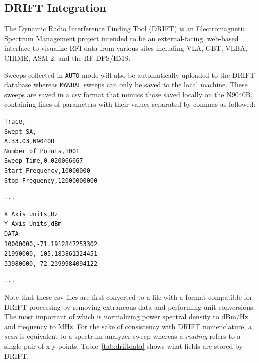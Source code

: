 \documentclass[titlepage]{article}
\begin{document}
\subsection{DRIFT Integration}
The Dynamic Radio Interference Finding Tool (DRIFT) is an Electromagnetic Spectrum Management project intended to be an external-facing, web-based interface to visualize RFI data from various sites including VLA, GBT, VLBA, CHIME, ASM-2, and the RF-DFS/EMS.\@

Sweeps collected in \verb|AUTO| mode will also be automatically uploaded to the DRIFT database whereas \verb|MANUAL| sweeps can only be saved to the local machine. These sweeps are saved in a csv format that mimics those saved locally on the N9040B, containing lines of parameters with their values separated by commas as followed:
\begin{lstlisting}[belowskip=0pt]
Trace,
Swept SA,
A.33.03,N9040B
Number of Points,1001
Sweep Time,0.020066667
Start Frequency,10000000
Stop Frequency,12000000000
\end{lstlisting}
\begin{lstlisting}[aboveskip=0pt, belowskip=0pt, numbers=none]
...
\end{lstlisting}
\begin{lstlisting}[aboveskip=0pt, belowskip=0pt, firstnumber=43]
X Axis Units,Hz
Y Axis Units,dBm
DATA
10000000,-71.1912847253302
21990000,-105.183861324451
33980000,-72.2399984094122
\end{lstlisting}
\begin{lstlisting}[aboveskip=0pt, numbers=none]
...
\end{lstlisting}
Note that these csv files are first converted to a file with a format compatible for DRIFT processing by removing extraneous data and performing unit conversions. The most important of which is normalizing power spectral density to dBm/Hz and frequency to MHz. For the sake of consistency with DRIFT nomenclature, a \textit{scan} is equivalent to a spectrum analyzer sweep whereas a \textit{reading} refers to a single pair of x-y points. Table~\ref{tab:driftdata} shows what fields are stored by DRIFT.\@
\end{document}
